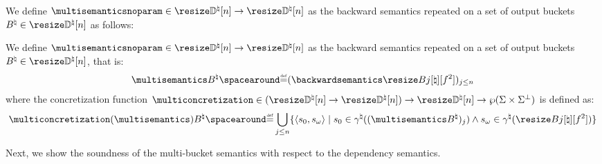 We define
$\multisemanticsnoparam\in\multitype$ as the backward semantics repeated on a set of output buckets $\buckets\in\vectorbuckets$ as follows:

\begin{definition}
  We define
$\multisemanticsnoparam\in\multitype$ as the backward semantics repeated on a set of output buckets $\buckets\in\vectorbuckets$, that is:
\begin{align*}
\multisemantics\buckets \DefeQ (\backwardsemantics\bucket)_{j\le n}
\end{align*}
where the concretization function $\multiconcretization\in(\multitype)\to\vectorbuckets\to\setof\pairofstates$ is defined as:
\begin{align*}\multiconcretization(\multisemantics)\buckets \DefeQ \bigsetjoin_{j\le n} \setdef{\inputoutputtuple{\defstate}}{\retrieveinput{\defstate}\in\abstractdomainconcretization((\multisemantics\buckets)_j)\land\retrieveoutput{\defstate}\in\abstractdomainconcretization(\bucket)}
\end{align*}
\end{definition}

Next, we show the soundness of the multi-bucket semantics with respect to the dependency semantics.

